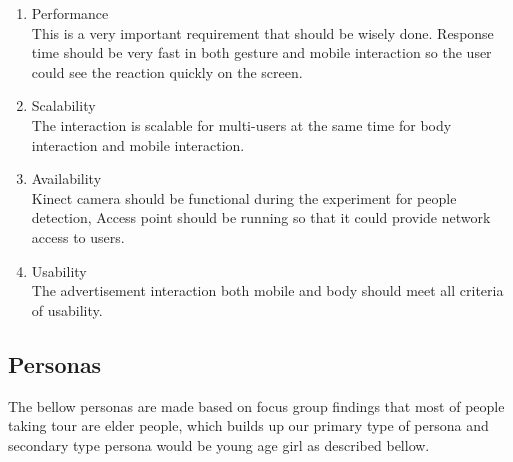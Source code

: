 \begin{enumerate}
\item	Performance \\
This is a very important requirement that should be wisely done. Response time should be very fast in both gesture and mobile interaction so the user could see the reaction quickly on the screen. 

\item	Scalability \\
The interaction is scalable for multi-users at the same time for body interaction and mobile interaction.

\item	Availability \\
Kinect camera should be functional during the experiment for people detection, Access point should be running so that it could provide network access to users.

\item	Usability \\
The advertisement interaction both mobile and body should meet all criteria of usability.
\end{enumerate}

\subsection{Personas}
The bellow personas are made based on focus group findings that most of people taking tour are elder people, which builds up our primary type of persona and secondary type persona would be young age girl as described bellow.


